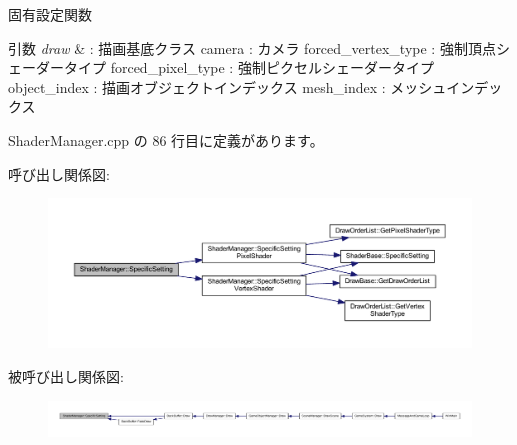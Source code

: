 固有設定関数 


\begin{DoxyParams}{引数}
{\em draw} & \+: 描画基底クラス camera \+: カメラ forced\+\_\+vertex\+\_\+type \+: 強制頂点シェーダータイプ forced\+\_\+pixel\+\_\+type \+: 強制ピクセルシェーダータイプ object\+\_\+index \+: 描画オブジェクトインデックス mesh\+\_\+index \+: メッシュインデックス \\
\hline
\end{DoxyParams}


 Shader\+Manager.\+cpp の 86 行目に定義があります。

呼び出し関係図\+:
\nopagebreak
\begin{figure}[H]
\begin{center}
\leavevmode
\includegraphics[width=350pt]{class_shader_manager_af016392b9b0477d49165d753e9404ff4_cgraph}
\end{center}
\end{figure}
被呼び出し関係図\+:
\nopagebreak
\begin{figure}[H]
\begin{center}
\leavevmode
\includegraphics[width=350pt]{class_shader_manager_af016392b9b0477d49165d753e9404ff4_icgraph}
\end{center}
\end{figure}
\mbox{\label{class_shader_manager_a1158156785098fe426dd514e4c2a97c1}} 

